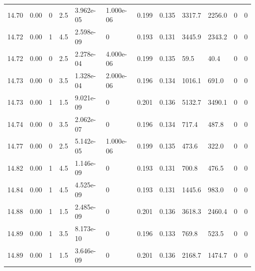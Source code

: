 \documentclass[preview]{standalone}
\begin{document}
{{{{{{{{{{{{{{{\begin{tabular}{L{1.2cm}C{1.2cm} C{0.3cm}C{0.5cm} C{1.4cm}C{1.4cm} C{1.4cm}C{1.4cm} C{1.6cm}C{1.6cm} C{1.6cm}C{1.6cm}}
  14.70  &  0.00  & 0     & 2.5 &  3.962e-05  & 1.000e-06  &  0.199&   0.135& 3317.7 & 2256.0   &  0 & 0  \\ 
  14.72  &  0.00  & 1     & 4.5 &  2.598e-09  & 0  &  0.193&   0.131& 3445.9 & 2343.2   &  0 & 0  \\ 
  14.72  &  0.00  & 0     & 2.5 &  2.278e-04  & 4.000e-06  &  0.199&   0.135& 59.5 & 40.4   &  0 & 0  \\ 
  14.73  &  0.00  & 0     & 3.5 &  1.328e-04  & 2.000e-06  &  0.196&   0.134& 1016.1 & 691.0   &  0 & 0  \\ 
  14.73  &  0.00  & 1     & 1.5 &  9.021e-09  & 0  &  0.201&   0.136& 5132.7 & 3490.1   &  0 & 0  \\ 
  14.74  &  0.00  & 0     & 3.5 &  2.062e-07  & 0  &  0.196&   0.134& 717.4 & 487.8   &  0 & 0  \\ 
  14.77  &  0.00  & 0     & 2.5 &  5.142e-05  & 1.000e-06  &  0.199&   0.135& 473.6 & 322.0   &  0 & 0  \\ 
  14.82  &  0.00  & 1     & 4.5 &  1.146e-09  & 0  &  0.193&   0.131& 700.8 & 476.5   &  0 & 0  \\ 
  14.84  &  0.00  & 1     & 4.5 &  4.525e-09  & 0  &  0.193&   0.131& 1445.6 & 983.0   &  0 & 0  \\ 
  14.88  &  0.00  & 1     & 1.5 &  2.485e-09  & 0  &  0.201&   0.136& 3618.3 & 2460.4   &  0 & 0  \\ 
  14.89  &  0.00  & 1     & 3.5 &  8.173e-10  & 0  &  0.196&   0.133& 769.8 & 523.5   &  0 & 0  \\ 
  14.89  &  0.00  & 1     & 1.5 &  3.646e-09  & 0  &  0.201&   0.136& 2168.7 & 1474.7   &  0 & 0  \\ 
\hline 
\end{tabular} 

}}}}}}}}}}}}}}}
\end{document}
